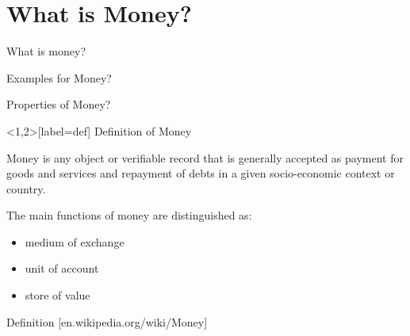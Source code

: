 \documentclass[12pt, usepdftitle=false]{beamer}
\begin{document}

\section{What is Money?}
\frame{\tableofcontents[currentsection]}
\begin{frame}{What is money?}

\begin{center}
\vspace{1em}
Examples for Money?\pause
\vspace{1em}

Properties of Money?
\end{center}

\end{frame}

\begin{frame}<1,2>[label=def]{ Definition of Money}
\begin{definition} 
Money is any object or verifiable record that is generally accepted as payment for goods and services and repayment of debts in a given socio-economic context or country.

The main functions of money are distinguished as:
\begin{itemize}
	\item medium of exchange
	\item unit of account
	\item store of value 
\end{itemize}
	\begin{flushright}
	\tiny{Definition [en.wikipedia.org/wiki/Money]}
	\end{flushright}%
\end{definition}%
\vspace{.5em}%

\end{frame}

\end{document}

